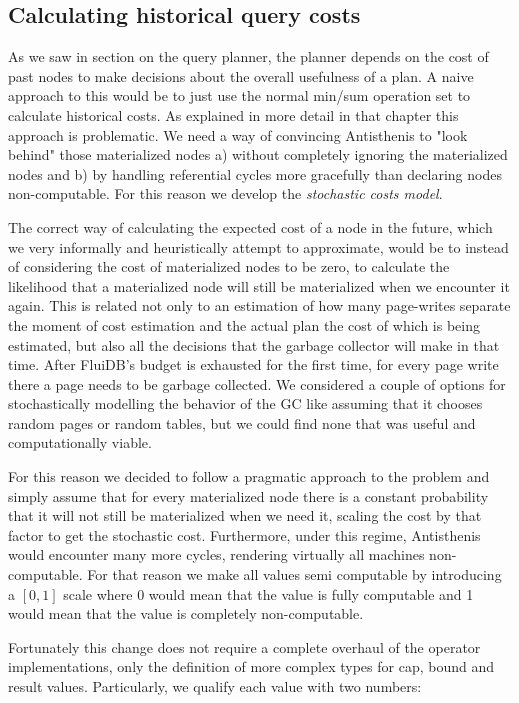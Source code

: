 \subsection{Calculating historical query costs}
\label{sec:historical_cost}

As we saw in section  on the query planner, the planner depends
on the cost of past nodes to make decisions about the overall
usefulness of a plan. A naive approach to this would be to just use
the normal min/sum operation set to calculate historical costs. As
explained in more detail in that chapter this approach is
problematic. We need a way of convincing Antisthenis to "look behind"
those materialized nodes a) without completely ignoring the
materialized nodes and b) by handling referential cycles more
gracefully than declaring nodes non-computable. For this reason we
develop the \emph{stochastic costs model}.

The correct way of calculating the expected cost of a node in the
future, which we very informally and heuristically attempt to
approximate, would be to instead of considering the cost of
materialized nodes to be zero, to calculate the likelihood that a
materialized node will still be materialized when we encounter it
again. This is related not only to an estimation of how many
page-writes separate the moment of cost estimation and the actual plan
the cost of which is being estimated, but also all the decisions that
the garbage collector will make in that time. After FluiDB's budget is
exhausted for the first time, for every page write there a page needs
to be garbage collected. We considered a couple of options for
stochastically modelling the behavior of the GC like assuming that it
chooses random pages or random tables, but we could find none that was
useful and computationally viable.

For this reason we decided to follow a pragmatic approach to the
problem and simply assume that for every materialized node there is a
constant probability that it will not still be materialized when we
need it, scaling the cost by that factor to get the stochastic
cost. Furthermore, under this regime, Antisthenis would encounter many
more cycles, rendering virtually all machines non-computable. For that
reason we make all values semi computable by introducing a \([0,1]\)
scale where 0 would mean that the value is fully computable and 1
would mean that the value is completely non-computable.

Fortunately this change does not require a complete overhaul of the
operator implementations, only the definition of more complex types
for cap, bound and result values. Particularly, we qualify each value
with two numbers:

